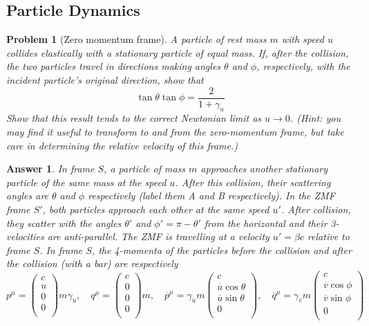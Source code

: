 \documentclass[a4paper]{article}
\theoremstyle{new2}
\newtheorem{ans}{Answer}[section]
\theoremstyle{new}
\newtheorem{qns}{Problem}[section]
\begin{document}
\subsection*{Particle Dynamics}
\begin{qns}[Zero momentum frame]
A particle of rest mass $m$ with speed $u$ collides elastically with a stationary particle of equal mass. If, after the collision, the two particles travel in directions making angles $\theta$ and $\phi$, respectively, with the incident particle’s original direction, show that
$$\tan\theta\tan\phi=\frac{2}{1+\gamma_u}$$
Show that this result tends to the correct Newtonian limit as $u\rightarrow0$. (Hint: you may find it useful to transform to and from the zero-momentum frame, but take care in determining the relative velocity of this frame.)
\end{qns}
\begin{ans}
In frame $S$, a particle of mass $m$ approaches another stationary particle of the same mass at the speed $u$. After this collision, their scattering angles are $\theta$ and $\phi$ respectively (label them A and B respectively). In the ZMF frame $S'$, both particles approach each other at the same speed $u'$. After collision, they scatter with the angles $\theta'$ and $\phi'=\pi-\theta'$ from the horizontal and their 3-velocities are anti-parallel. The ZMF is travelling at a velocity $u'=\beta c$ relative to frame $S$. In frame $S$, the 4-momenta of the particles before the collision and after the collision (with a bar) are respectively
$$p^\mu=\begin{pmatrix}c\\u\\0\\0\\\end{pmatrix}m\gamma_u,\quad q^\mu=\begin{pmatrix}c\\0\\0\\0\\\end{pmatrix}m,\quad\overline{p}^\mu=\gamma_{\overline{u}}m\begin{pmatrix}c\\\overline{u}\cos\theta\\\overline{u}\sin\theta\\0\\\end{pmatrix},\quad \overline{q}^\mu=\gamma_{\overline{v}}m\begin{pmatrix}c\\\overline{v}\cos\phi\\\overline{v}\sin\phi\\0\\\end{pmatrix}$$

\end{ans}
\end{document}
